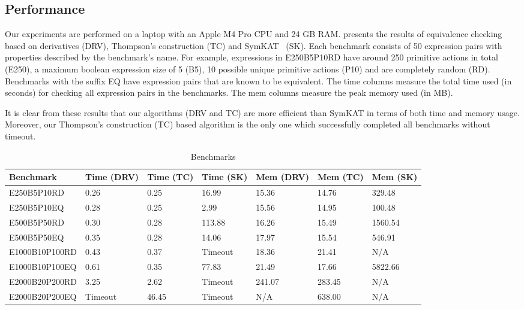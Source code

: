 \documentclass[conference]{IEEEtran}
\begin{document}
\subsection{Performance}\label{sec:performance-implementation}
Our experiments are performed on a laptop with an Apple M4 Pro CPU and 24 GB RAM.  presents the results of equivalence checking based on derivatives (DRV), Thompson's construction (TC) and SymKAT~\cite{pous_SymbolicAlgorithmsLanguage_2015} (SK). Each benchmark consists of 50 expression pairs with properties described by the benchmark's name. For example, expressions in E250B5P10RD have around 250 primitive actions in total (E250), a maximum boolean expression size of 5 (B5), 10 possible unique primitive actions (P10) and are completely random (RD). Benchmarks with the suffix EQ have expression pairs that are known to be equivalent. The time columns measure the total time used (in seconds) for checking all expression pairs in the benchmarks. The mem columns measure the peak memory used (in MB).

It is clear from these results that our algorithms (DRV and TC) are more efficient than SymKAT in terms of both time and memory usage. Moreover, our Thompson's construction (TC) based algorithm is the only one which successfully completed all benchmarks without timeout.

\begin{table*}
\centering
\begin{tabular}{l l l l l l l}
    Benchmark & Time (DRV) & Time (TC) & Time (SK) & Mem (DRV) & Mem (TC) & Mem (SK) \\
    \hline
    E250B5P10RD    & 0.26    & 0.25  & 16.99   & 15.36  & 14.76  & 329.48  \\
    E250B5P10EQ    & 0.28    & 0.25  & 2.99    & 15.56  & 14.95  & 100.48  \\
    E500B5P50RD    & 0.30    & 0.28  & 113.88  & 16.26  & 15.49  & 1560.54 \\
    E500B5P50EQ    & 0.35    & 0.28  & 14.06   & 17.97  & 15.54  & 546.91  \\
    E1000B10P100RD & 0.43    & 0.37  & Timeout & 18.36  & 21.41  & N/A     \\
    E1000B10P100EQ & 0.61    & 0.35  & 77.83   & 21.49  & 17.66  & 5822.66 \\
    E2000B20P200RD & 3.25    & 2.62  & Timeout & 241.07 & 283.45 & N/A     \\
    E2000B20P200EQ & Timeout & 46.45 & Timeout & N/A    & 638.00 & N/A     \\
\end{tabular}
\caption{Benchmarks}\label{tab:benchmark}
\end{table*}
\end{document}
